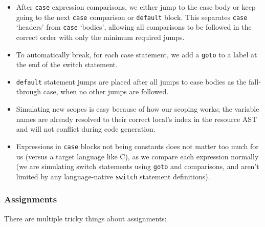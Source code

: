 \documentclass[11pt]{article}
\begin{document}
\begin{itemize}
\item After \texttt{case} expression comparisons, we either jump
  to the case body or keep going to the next \texttt{case} comparison
  or \texttt{default} block. This separates \texttt{case} `headers'
  from \texttt{case} `bodies', allowing all comparisons to be followed
  in the correct order with only the minimum required jumps.
\item To automatically break, for each case statement, we add a
  \texttt{goto} to a label at the end of the switch statement.
\item \texttt{default} statement jumps are placed after all
  jumps to case bodies as the fall-through case, when no other jumps
  are followed.
\item Simulating new scopes is easy because of how our scoping works;
  the variable names are already resolved to their correct local's
  index in the resource AST and will not conflict during code generation.
\item Expressions in \texttt{case} blocks not being constants does not
  matter too much for us (versus a target language like C), as we compare
  each expression normally (we are simulating switch statements using
  \texttt{goto} and comparisons, and aren't limited by any language-native
  \texttt{switch} statement definitions).
\end{itemize}

\subsubsection{Assignments}

There are multiple tricky things about assignments:
\end{document}
